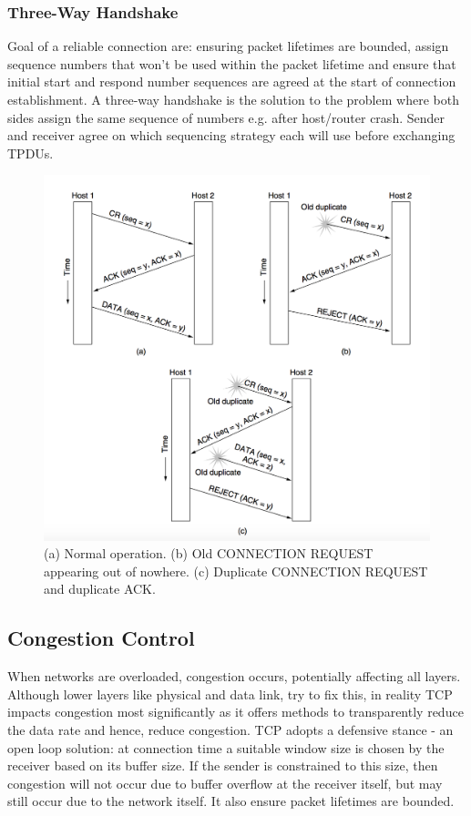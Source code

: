 \documentclass[twoside]{article}
\begin{document}
\subsubsection{Three-Way Handshake}
Goal of a reliable connection are: ensuring packet lifetimes are bounded, assign
sequence numbers that won't be used within the packet lifetime and ensure that 
initial start and respond number sequences are agreed at the start of connection
establishment. A three-way handshake is the solution to the problem where both
sides assign the same sequence of numbers e.g. after host/router crash. Sender 
and receiver agree on which sequencing strategy each will use before exchanging
TPDUs.
\begin{figure}
  \includegraphics[width=\linewidth]{three-way-handshake.png}
  \caption{(a) Normal operation. (b) Old CONNECTION REQUEST appearing out of 
  nowhere. (c) Duplicate CONNECTION REQUEST and duplicate ACK.}
  \label{fig:three-way-handshake}
\end{figure}
\subsection{Congestion Control}
When networks are overloaded, congestion occurs, potentially affecting all 
layers. Although lower layers like physical and data link, try to fix this,
in reality TCP impacts congestion most significantly as it offers methods to 
transparently reduce the data rate and hence, reduce congestion. TCP adopts
a defensive stance - an open loop solution: at connection time a suitable 
window size is chosen by the receiver based on its buffer size. If the sender
is constrained to this size, then congestion will not occur due to buffer
overflow at the receiver itself, but may still occur due to the network itself.
It also ensure packet lifetimes are bounded.
\end{document}
